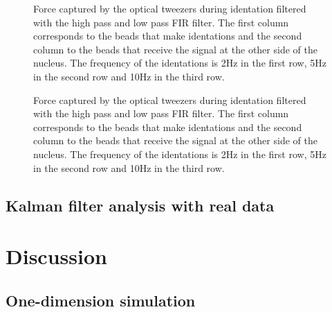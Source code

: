\documentclass[12pt, a4paper]{article} %
\begin{document}
\newpage

\begin{figure}[htbp]
  \centering
  
  \caption{Force captured by the optical tweezers during identation filtered with the high pass and low pass FIR filter. The first column corresponds to the beads that make identations and the second column to the beads that receive the signal at the other side of the nucleus. The frequency of the identations is 2Hz in the first row, 5Hz in the second row and 10Hz in the third row.}
  \label{fig:filtered_data}
\end{figure}

\begin{figure}[H]
    \centering
    
  \caption{Force captured by the optical tweezers during identation filtered with the high pass and low pass FIR filter. The first column corresponds to the beads that make identations and the second column to the beads that receive the signal at the other side of the nucleus. The frequency of the identations is 2Hz in the first row, 5Hz in the second row and 10Hz in the third row.}
  \label{fig:fourier_con_filtro_todo}
\end{figure}

\newpage
\subsection{Kalman filter analysis with real data}

\setlength{\parskip}{0mm}

\setlength{\parskip}{4mm}

\newpage


\section{Discussion}

\subsection{One-dimension simulation}
\end{document}
